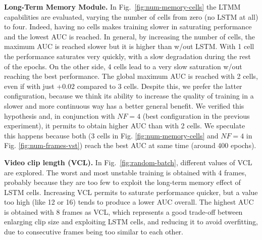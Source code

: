 \noindent\textbf{Long-Term Memory Module.}
In Fig.~\ref{fig:num-memory-cells} the LTMM capabilities are evaluated, varying the number of cells from zero (no LSTM at all) to four.
Indeed, having no cells makes training slower in saturating performance and the lowest AUC is reached.
In general, by increasing the number of cells, the maximum AUC is reached slower but it is higher than w/out LSTM.
With 1 cell the performance saturates very quickly, with a slow degradation during the rest of the epochs.
On the other side, 4 cells lead to a very slow saturation w/out reaching the best performance.
The global maximum AUC is reached with 2 cells, even if with just +$0.02$ compared to 3 cells.
Despite this, we prefer the latter configuration, because we think its ability to increase the quality of training in a slower and more continuous way has a better general benefit.
We verified this hypothesis and, in conjunction with $\mathit{NF}=4$ (best configuration in the previous experiment), it permits to obtain higher AUC than with 2 cells.
We speculate this happens because both (3 cells in Fig. \ref{fig:num-memory-cells} and $\mathit{NF}=4$ in Fig. \ref{fig:num-frames-vst}) reach the best AUC at same time (around 400 epochs).


\noindent\textbf{Video clip length (VCL).}
In Fig.~\ref{fig:random-batch}, different values of VCL are explored.
The worst and most unstable training is obtained with 4 frames, probably because they are too few to exploit the long-term memory effect of LSTM cells.
Increasing VCL permits to saturate performance quicker, but a value too high (like 12 or 16) tends to produce a lower AUC overall.
The highest AUC is obtained with 8 frames as VCL, which represents a good trade-off between enlarging clip size and exploiting LSTM cells, and reducing it to avoid overfitting, due to consecutive frames being too similar to each other.

